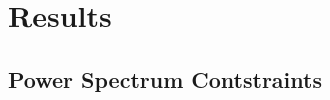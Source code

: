 \documentclass[twocolumn,numberedappendix]{emulateapj} \shorttitle{PSA64}
\begin{document}
%




\section{Results}\label{sec:results}

\subsection{Power Spectrum Contstraints}
\end{document}
